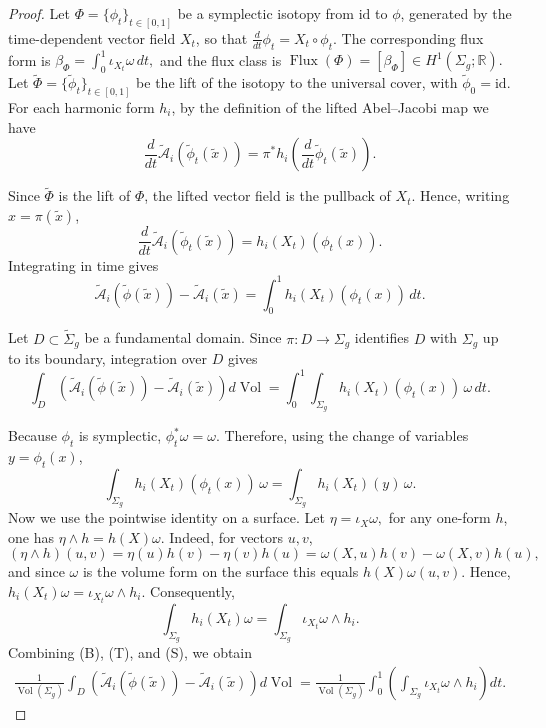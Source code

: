 \documentclass[11pt]{article}
\theoremstyle{definition}
\begin{document}
	\begin{proof}
		Let $\Phi=\{\phi_t\}_{t\in[0,1]}$ be a symplectic isotopy from $\mathrm{id}$ to
		$\phi$, generated by the time-dependent vector field $X_t$, so that
		$\frac{d}{dt}\phi_t=X_t\circ\phi_t.$ The corresponding flux form is
		$\beta_\Phi=\int_0^1\iota_{X_t}\omega\,dt,$ and the flux class is
		$\operatorname{Flux}(\Phi)=[\beta_\Phi]\in H^1(\Sigma_g;\mathbb R).$ Let
		$\widetilde\Phi = \{\widetilde\phi_t\}_{t\in[0,1]}$ be the lift of the isotopy
		to the universal cover, with $\widetilde\phi_0=\mathrm{id}$. For each harmonic
		form $h_i$, by the definition of the lifted Abel--Jacobi map we have
		\[
		\frac{d}{dt}
		\widetilde{\mathcal A}_i
		(\widetilde\phi_t(\tilde x))
		=
		\pi^*h_i
		\left(
		\frac{d}{dt}\widetilde\phi_t(\tilde x)
		\right).
		\]
		
		Since $\widetilde\Phi$ is the lift of $\Phi$, the lifted vector field is the
		pullback of $X_t$. Hence, writing $x=\pi(\tilde x)$,
		\[
		\frac{d}{dt} \widetilde{\mathcal A}_i (\widetilde\phi_t(\tilde x)) =
		h_i(X_t)(\phi_t(x)).
		\]
		Integrating in time gives
		\[
		\widetilde{\mathcal A}_i(\widetilde\phi(\tilde x))
		-
		\widetilde{\mathcal A}_i(\tilde x)
		=
		\int_0^1 h_i(X_t)(\phi_t(x))\,dt.
		\tag{A}
		\]
		
		Let $D\subset\widetilde{\Sigma}_g$ be a fundamental domain. Since $\pi:D
		\rightarrow\Sigma_g$ identifies $D$ with $\Sigma_g$ up to its boundary,
		integration over $D$ gives
		\[
		\int_D
		\left(
		\widetilde{\mathcal A}_i(\widetilde\phi(\tilde x))
		-
		\widetilde{\mathcal A}_i(\tilde x)
		\right)d\operatorname{Vol}
		=
		\int_0^1
		\int_{\Sigma_g}
		h_i(X_t)(\phi_t(x))
		\,\omega\,dt.
		\tag{B}
		\]
		
		Because $\phi_t$ is symplectic, $\phi_t^*\omega=\omega.$ Therefore, using the
		change of variables $y=\phi_t(x)$,
		\[
		\int_{\Sigma_g}
		h_i(X_t)(\phi_t(x))\,\omega
		=
		\int_{\Sigma_g}
		h_i(X_t)(y)\,\omega.
		\tag{T}
		\]
		Now we use the pointwise identity on a surface. Let $\eta=\iota_X\omega,$ for
		any one-form $h$, one has $\eta\wedge h=h(X)\omega.$ Indeed, for vectors $u,v$,
		\[
		(\eta\wedge h)(u,v)
		=
		\eta(u)h(v)-\eta(v)h(u)
		=
		\omega(X,u)h(v)-\omega(X,v)h(u),
		\]
		and since $\omega$ is the volume form on the surface this equals
		$h(X)\omega(u,v)$. Hence, $h_i(X_t)\omega = \iota_{X_t}\omega\wedge h_i.$
		Consequently,
		\[
		\int_{\Sigma_g}h_i(X_t)\omega
		=
		\int_{\Sigma_g}
		\iota_{X_t}\omega\wedge h_i.
		\tag{S}
		\]
		Combining (B), (T), and (S), we obtain
		\[
		\begin{aligned}
			\frac1{\operatorname{Vol}(\Sigma_g)}
			\int_D
			\left(
			\widetilde{\mathcal A}_i(\widetilde\phi(\tilde x))
			-
			\widetilde{\mathcal A}_i(\tilde x)
			\right)
			d\operatorname{Vol}
			=
			\frac1{\operatorname{Vol}(\Sigma_g)}
			\int_0^1
			\left(
			\int_{\Sigma_g}
			\iota_{X_t}\omega\wedge h_i
			\right)dt.
		\end{aligned}
		\tag{K}
		\]
		

\end{proof}
\end{document}
